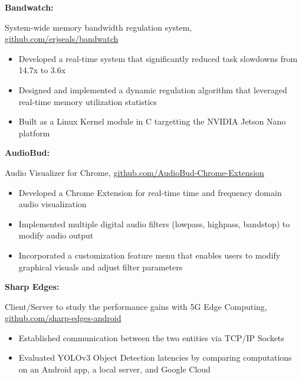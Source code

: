 \documentclass[letterpaper,10pt]{article}
\newcommand{\resumeItem}[2]{
  \item\normalsize{
    {#1}{#2 \vspace{-2pt}}
  }
}
\newcommand{\resumeSubItem}[2]{\resumeItem{#1}{#2}\vspace{-4pt}}
\begin{document}
{      \resumeSubItem{\textbf{Bandwatch: }}
      {System-wide memory bandwidth regulation system, \href{https://github.com/erjseals/bandwatch}{github.com/erjseals/bandwatch}
         \vspace{-4pt}
         \begin{itemize}
          \item Developed a real-time system that significantly reduced task slowdowns from 14.7x to 3.6x
          \vspace{-1pt}
          \item Designed and implemented a dynamic regulation algorithm that leveraged real-time memory utilization statistics
          \vspace{-1pt}
          \item Built as a Linux Kernel module in C targetting the NVIDIA Jetson Nano platform
         \end{itemize}
      }

     \vspace{4pt}

      \resumeSubItem{\textbf{AudioBud: }}
      {Audio Visualizer for Chrome, \href{https://github.com/eric-delacruz-prod/AudioBud-Chrome-Extension}{github.com/AudioBud-Chrome-Extension}
         \vspace{-4pt}
         \begin{itemize}
            \item Developed a Chrome Extension for real-time time and frequency domain audio visualization
            \vspace{-1pt}
            \item Implemented multiple digital audio filters (lowpass, highpass, bandstop) to modify audio output
            \vspace{-1pt}
            \item Incorporated a customization feature menu that enables users to modify graphical visuals and adjust filter parameters
         \end{itemize}
      }

      \vspace{4pt}

      \resumeSubItem{\textbf{Sharp Edges: }}
      {Client/Server to study the performance gains with 5G Edge Computing, \href{https://github.com/erjseals/sharp-edges-android}{github.com/sharp-edges-android}
         \vspace{-4pt}
         \begin{itemize}
          \item Established communication between the two entities via TCP/IP Sockets 
          \vspace{-1pt}
          \item Evaluated YOLOv3 Object Detection latencies by comparing computations on an Android app, a local server, and Google Cloud
         \end{itemize}
      }

}
\end{document}
